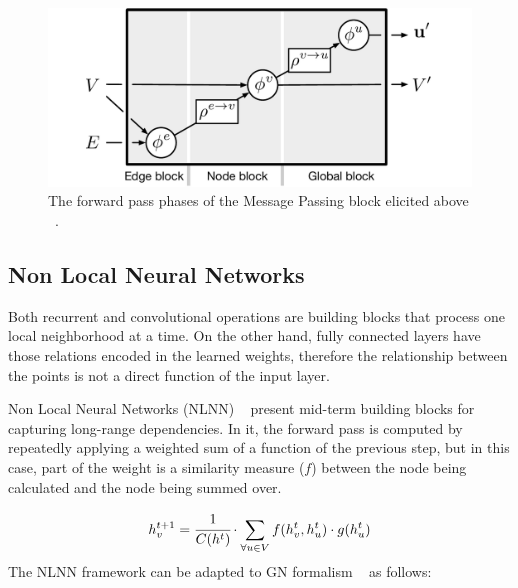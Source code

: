 \begin{figure}[H]
    \centering
    \includegraphics[width=.7\textwidth]{fig/content/graph_nets/blocks/mpnn.pdf}
    \caption{The forward pass phases of the Message Passing block elicited above ~\cite{Battaglia_2018}.}
    \label{fig:mpnn}
\end{figure}



\subsection{Non Local Neural Networks}

Both recurrent and convolutional operations are building blocks that process one local neighborhood at a time. On the other hand, fully connected layers have those relations encoded in the learned weights, therefore the relationship between the points is not a direct function of the input layer. 

Non Local Neural Networks (NLNN) ~\cite{Wang_2018} present mid-term building blocks for capturing long-range dependencies. In it, the forward pass is computed by repeatedly applying a weighted sum of a function of the previous step, but in this case, part of the weight is a similarity measure ($f$) between the node being calculated and the node being summed over.

\begin{equation}
    h^{t+1}_v = 
    \cfrac{1}{C(h^t)} 
    \cdot \sum_{\forall u \in V} {
        f(h^t_v,h^t_u) \cdot g(h^t_u)
    }
\end{equation}
The NLNN framework can be adapted to GN formalism ~\cite{Battaglia_2018} as follows:

